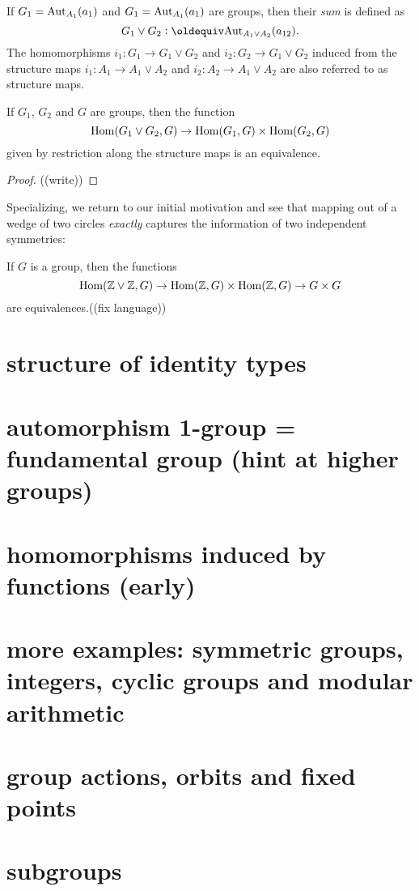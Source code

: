 \begin{definition}
  \label{def:sumofgroup}
  If $G_1=\mathrm{Aut}_{A_1}(a_1)$ and $G_1=\mathrm{Aut}_{A_1}(a_1)$ are groups, then their \emph{sum} is defined as
  $$G_1\vee G_2\defequi \aut_{A_1\vee A_2}(a_{12}).$$ The homomorphisms $i_1:G_1\to G_1\vee G_2$ and $i_2:G_2\to G_1\vee G_2$ induced from the structure maps  $i_1:A_1\to A_1\vee A_2$ and  $i_2:A_2\to A_1\vee A_2$ are also referred to as structure maps.
\end{definition}
\begin{lemma}
  \label{lem:sumofgroupsISsum} If $G_1$, $G_2$ and $G$ are groups, then the function
  $$\mathrm{Hom}(G_1\vee G_2,G)\to\mathrm{Hom}(G_1,G)\times\mathrm{Hom}(G_2,G)$$ 
given by restriction along the structure maps is an equivalence.
\end{lemma}
\begin{proof}
  ((write))
\end{proof}
Specializing, we return to our initial motivation and see that mapping out of a wedge of two circles \emph{exactly} captures the information of two independent symmetries:
\begin{corollary}
  \label{cor:ZplusZuniv}
  If $G$ is a group, then the functions
  $$\mathrm{Hom}(\mathbb{Z}\vee\mathbb{Z},G)\to \mathrm{Hom}(\mathbb{Z},G)\times\mathrm{Hom}(\mathbb{Z},G)\to G\times G$$
  are equivalences.((fix language))
\end{corollary}



\section{structure of identity types}
\section{automorphism 1-group = fundamental group (hint at higher groups)}
\section{homomorphisms induced by functions (early)}
\section{more examples: symmetric groups, integers, cyclic groups and modular arithmetic}
\section{group actions, orbits and fixed points}
\section{subgroups}
